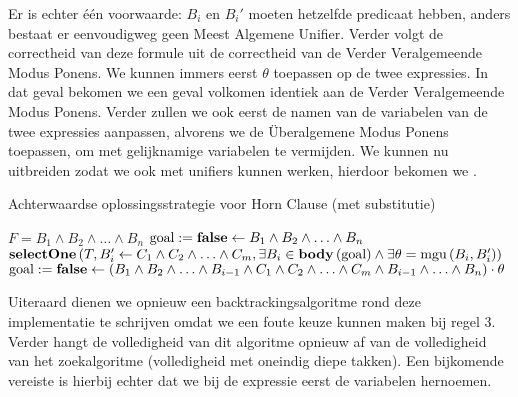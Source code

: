 Er is echter één voorwaarde: $B_i$ en $B_i'$ moeten hetzelfde predicaat hebben, anders bestaat er eenvoudigweg geen Meest Algemene Unifier. Verder volgt de correctheid van deze formule uit de correctheid van de Verder Veralgemeende Modus Ponens. We kunnen immers eerst $\theta$ toepassen op de twee expressies. In dat geval bekomen we een geval volkomen identiek aan de Verder Veralgemeende Modus Ponens. Verder zullen we ook eerst de namen van de variabelen van de twee expressies aanpassen, alvorens we de Überalgemene Modus Ponens toepassen, om  met gelijknamige variabelen te vermijden. We kunnen nu  uitbreiden zodat we ook met unifiers kunnen werken, hierdoor bekomen we .
\begin{algorithm}[htb]
\caption{Achterwaardse oplossingsstrategie voor Horn Clause (met substitutie)}
\label{alg:backwardUberalgemeneModusPonens}
\begin{algorithmic}[1]
\REQUIRE $F=B_1\wedge B_2\wedge\ldots\wedge B_n$
\STATE $\mbox{goal}:=\mbox{\bf false}\leftarrow B_1\wedge B_2\wedge\ldots\wedge B_n$
\REPEAT
\STATE$\mbox{\bf selectOne}\left( T,B_i'\leftarrow C_1\wedge C_2\wedge\ldots\wedge C_m,\exists B_i\in\mbox{\bf body}\left( \mbox{goal} \right)\wedge\exists\theta=\mbox{mgu}\left( B_i,B_i' \right) \right)$
\STATE$\mbox{goal}:=\mbox{\bf false}\leftarrow\left(B_1\wedge B_2\wedge\ldots\wedge B_{i-1}\wedge C_1\wedge C_2\wedge\ldots\wedge C_m\wedge B_{i-1}\wedge\ldots\wedge B_n\right)\cdot\theta$
\end{algorithmic}
\end{algorithm}

Uiteraard dienen we opnieuw een backtrackingsalgoritme rond deze implementatie te schrijven omdat we een foute keuze kunnen maken bij regel 3. Verder hangt de volledigheid van dit algoritme opnieuw af van de volledigheid van het zoekalgoritme (volledigheid met oneindig diepe takken). Een bijkomende vereiste is hierbij echter dat we bij de expressie eerst de variabelen hernoemen.
